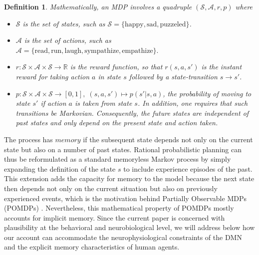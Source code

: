 \documentclass[10pt,letterpaper]{article}
\newtheorem*{definition*}{Definition}
\begin{document}
\begin{definition*}
Mathematically, an MDP involves a quadruple $(\mathcal S, \mathcal A, r, p)$ where
\begin{itemize}
\item $\mathcal S$ is the set of states, such as $\mathcal S = \{\text{happy}, \text{sad}, \text{puzzeled}\}$.
\item $\mathcal A$ is the set of actions, such as $\mathcal A = \{\text{read}, \text{run},
  \text{laugh}, \text{sympathize}, \text{empathize}\}.$
\item $r : \mathcal S \times \mathcal A \times \mathcal S \rightarrow \mathbb R$ is the \textit{reward function},
   so that $r(s, a, s')$ is the instant reward for taking action $a$ in state $s$ followed by a state-transition $s \rightarrow s'$.
\item $p : \mathcal S \times \mathcal A \times \mathcal S \rightarrow [0, 1],\; (s,a,s') \mapsto p(s'|s,a)$,
  the probability of moving to state $s'$ if action $a$ is taken from state $s$. In addition, one requires that such
  transitions be Markovian. Consequently, the future states are independent of past states and only depend on the present state and action taken.
\end{itemize}
\end{definition*}

The process has $memory$ if the subsequent state depends not only on the current state but also on a number of past states. Rational probabilistic planning can thus be reformulated as a standard memoryless Markov process by simply expanding the definition of the state $s$ to include experience episodes of the past. This extension adds the capacity for memory to the model because the next state then depends not only on the current situation but also on previously experienced events, which is the motivation behind Partially Observable MDPs (POMDPs)
\citep{starkweather2017dopamine,o2006making}.
Nevertheless, this mathematical property of POMDPs mostly accounts for implicit memory. Since the current paper is concerned with plausibility at the behavioral and neurobiological level, we will address below how our account can accommodate the neurophysiological constraints of the DMN and the explicit memory characteristics of human agents.
\end{document}
